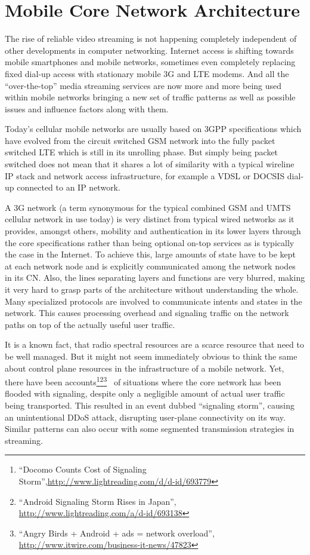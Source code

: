\chapter{Mobile Core Network Architecture}
\label{chap:mobilenets}

The rise of reliable video streaming is not happening completely independent of other developments in computer networking. Internet access is shifting towards mobile smartphones and mobile networks, sometimes even completely replacing fixed dial-up access  with stationary mobile \gls{3G} and \gls{LTE} modems. And all the ``over-the-top'' media streaming services are now more and more being used within mobile networks bringing a new set of traffic patterns as well as possible issues and influence factors along with them.

Today's cellular mobile networks are usually based on \gls{3GPP} specifications which have evolved from the circuit switched \gls{GSM} network into the fully packet switched \gls{LTE} which is still in its unrolling phase. But simply being packet switched does not mean that it shares a lot of similarity with a typical wireline \gls{IP} stack and network access infrastructure, for example a \gls{VDSL} or \gls{DOCSIS} dial-up connected to an \gls{IP} network. 

A \gls{3G} network (a term synonymous for the typical combined \gls{GSM} and \gls{UMTS} cellular network in use today) is very distinct from typical wired networks as it provides, amongst others, mobility and authentication in its lower layers through the core specifications rather than being optional on-top services as is typically the case in the Internet. To achieve this, large amounts of state have to be kept at each network node and is explicitly communicated among the network nodes in its \gls{CN}. Also, the lines separating layers and functions are very blurred, making it very hard to grasp parts of the architecture without understanding the whole. Many specialized protocols are involved to communicate intents and states in the network. This causes processing overhead and signaling traffic on the network paths on top of the actually useful user traffic. 

It is a known fact, that radio spectral resources are a scarce resource that need to be well managed. But it might not seem immediately obvious to think the same about control plane resources in the infrastructure of a mobile network. Yet, there have been accounts\footnote{``Docomo Counts Cost of Signaling Storm'',\url{http://www.lightreading.com/d/d-id/693779}}\footnote{``Android Signaling Storm Rises in Japan'', \url{http://www.lightreading.com/a/d-id/693138}}\footnote{``Angry Birds + Android + ads = network overload'', \url{http://www.itwire.com/business-it-news/47823}}~\cite{huawei2011storm} of situations where the core network has been flooded with signaling, despite only a negligible amount of actual user traffic being transported. This resulted in an event dubbed ``signaling storm'', causing an unintentional \gls{DDoS} attack, disrupting user-plane connectivity on its way. Similar patterns can also occur with some segmented transmission strategies in streaming.

